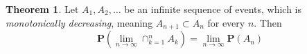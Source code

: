 \documentclass{tufte-handout}
\theoremstyle{definition} \newtheorem{definition}{Definition}
\newtheorem{theorem}{Theorem}
\theoremstyle{remark} \newtheorem{remark}{Remark}
\newcommand{\prob}[1]{\mathbf{P}\left(#1\right)}
\begin{document}
\begin{theorem}
  Let $A_1, A_2, \ldots$ be an infinite sequence of events, which is
  \emph{monotonically decreasing}, meaning $A_{n+1} \subset A_n$ for every
  $n$. Then
  \begin{equation*}
    \prob{\lim_{n \to \infty} \cap_{k=1}^n A_k} =
    \lim_{n \to \infty} \prob{A_n}
  \end{equation*}
\end{theorem}
\end{document}

